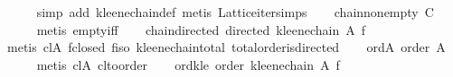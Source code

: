 \begin{isabellebody}
\ \ \ \ \isamarkupfalse%
\ {}simp\ add{}\ kleene{}chain{}def{}\ metis\ Lattice{}iter{}simps{}{}{}{}\isanewline
\ \ \isamarkupfalse%
\ chain{}non{}empty{}\ {}{}C\ {}\ {}{}{}\isanewline
\ \ \ \ \isamarkupfalse%
\ {}metis\ empty{}iff{}\isanewline
\isanewline
\ \ \isamarkupfalse%
\ chain{}directed{}\ {}directed\ {}kleene{}chain\ A\ f{}{}\isanewline
\ \ \ \ \isamarkupfalse%
\ {}metis\ cl{}A\ f{}closed\ f{}iso\ kleene{}chain{}total\ total{}order{}is{}directed{}\isanewline
\isanewline
\ \ \isamarkupfalse%
\ ord{}A{}\ {}order\ A{}\isanewline
\ \ \ \ \isamarkupfalse%
\ {}metis\ cl{}A\ cl{}to{}order{}\isanewline
\isanewline
\ \ \isamarkupfalse%
\ ord{}kle{}\ {}order\ {}kleene{}chain\ A\ f{}{}\isanewline

\end{isabellebody}
